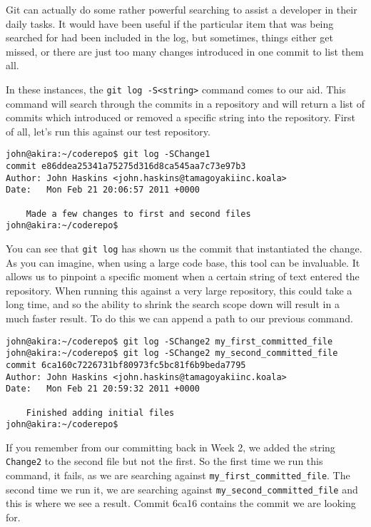 Git can actually do some rather powerful searching to assist a developer in their daily tasks.  It would have been useful if the particular item that was being searched for had been included in the log, but sometimes, things either get missed, or there are just too many changes introduced in one commit to list them all.

In these instances, the \texttt{git log -S<string>} command comes to our aid.  This command will search through the commits in a repository and will return a list of commits which introduced or removed a specific string into the repository.  First of all, let's run this against our test repository.

\begin{Verbatim}[frame=leftline,framerule=1mm,fontsize=\relsize{-3}] 
john@akira:~/coderepo$ git log -SChange1
commit e86ddea25341a75275d316d8ca545aa7c73e97b3
Author: John Haskins <john.haskins@tamagoyakiinc.koala>
Date:   Mon Feb 21 20:06:57 2011 +0000

    Made a few changes to first and second files
john@akira:~/coderepo$ 
\end{Verbatim}

You can see that \texttt{git log} has shown us the commit that instantiated the change.  As you can imagine, when using a large code base, this tool can be invaluable.  It allows us to pinpoint a specific moment when a certain string of text entered the repository.  When running this against a very large repository, this could take a long time, and so the ability to shrink the search scope down will result in a much faster result.  To do this we can append a path to our previous command.  

\begin{Verbatim}[frame=leftline,framerule=1mm,fontsize=\relsize{-3}] 
john@akira:~/coderepo$ git log -SChange2 my_first_committed_file
john@akira:~/coderepo$ git log -SChange2 my_second_committed_file
commit 6ca160c7226731bf80973fc5bc81f6b9beda7795
Author: John Haskins <john.haskins@tamagoyakiinc.koala>
Date:   Mon Feb 21 20:59:32 2011 +0000

    Finished adding initial files
john@akira:~/coderepo$ 
\end{Verbatim}

If you remember from our committing back in Week 2, we added the string \texttt{Change2} to the second file but not the first.  So the first time we run this command, it fails, as we are searching against \texttt{my\_first\_committed\_file}.  The second time we run it, we are searching against \texttt{my\_second\_committed\_file} and this is where we see a result.  Commit 6ca16 contains the commit we are looking for.

